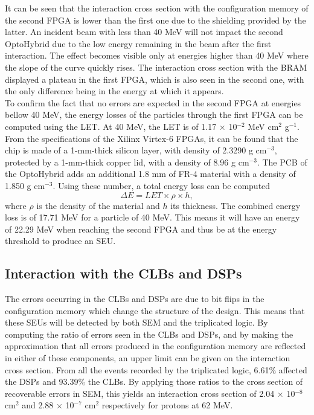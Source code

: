       It can be seen that the interaction cross section with the configuration memory of the second FPGA is lower than the first one due to the shielding provided by the latter. An incident beam with less than 40 MeV will not impact the second OptoHybrid due to the low energy remaining in the beam after the first interaction. The effect becomes visible only at energies higher than 40 MeV where the slope of the curve quickly rises. The interaction cross section with the BRAM displayed a plateau in the first FPGA, which is also seen in the second one, with the only difference being in the energy at which it appears. \\

      To confirm the fact that no errors are expected in the second FPGA at energies bellow 40 MeV, the energy losses of the particles through the first FPGA can be computed using the LET. At 40 MeV, the LET is of 1.17 $ \times $ 10$^{-2} $ MeV cm$^2$ g$^{-1}$. From the specifications of the Xilinx Virtex-6 FPGAs, it can be found that the chip is made of a 1-mm-thick silicon layer, with density of 2.3290 g cm$^{-3}$, protected by a 1-mm-thick copper lid, with a density of 8.96 g cm$^{-3}$. The PCB of the OptoHybrid adds an additional 1.8 mm of FR-4 material with a density of 1.850 g cm$^{-3}$. Using these number, a total energy loss can be computed
      \begin{equation}
        \Delta E = LET \times \rho \times h,
      \end{equation}
      where $\rho$ is the density of the material and $ h $ its thickness. The combined energy loss is of 17.71 MeV for a particle of 40 MeV. This means it will have an energy of 22.29 MeV when reaching the second FPGA and thus be at the energy threshold to produce an SEU.

    \subsection{Interaction with the CLBs and DSPs}

      The errors occurring in the CLBs and DSPs are due to bit flips in the configuration memory which change the structure of the design. This means that these SEUs will be detected by both SEM and the triplicated logic. By computing the ratio of errors seen in the CLBs and DSPs, and by making the approximation that all errors produced in the configuration memory are reflected in either of these components, an upper limit can be given on the interaction cross section. From all the events recorded by the triplicated logic, 6.61\% affected the DSPs and 93.39\% the CLBs. By applying those ratios to the cross section of recoverable errors in SEM, this yields an interaction cross section of 2.04 $ \times $ 10$^{-8}$ cm$^2$ and 2.88 $ \times $ 10$^{-7}$ cm$^2$ respectively for protons at 62 MeV.

